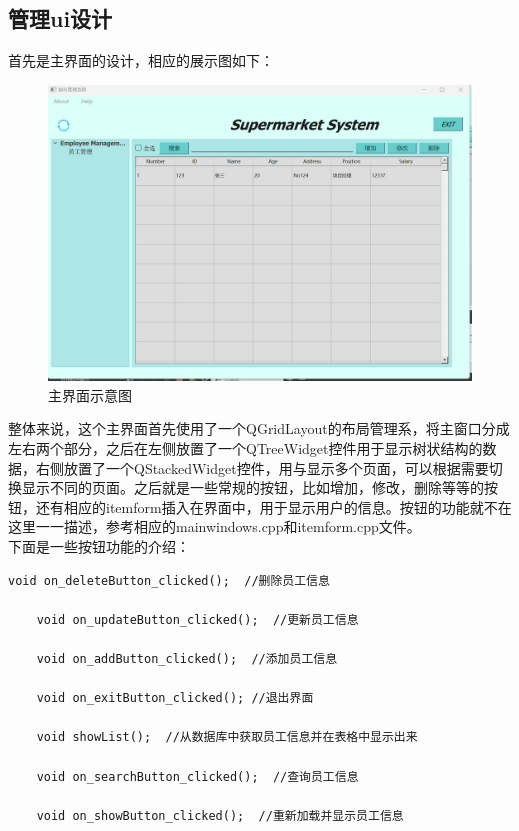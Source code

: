 \documentclass{article}
\begin{document}
\subsection{管理ui设计}
首先是主界面的设计，相应的展示图如下：
\begin{figure}[H]
        \centering
        \includegraphics[scale=0.6]{主界面.png}
        \caption{主界面示意图}
        \label{fig:enter-label}
\end{figure}
整体来说，这个主界面首先使用了一个QGridLayout的布局管理系，将主窗口分成左右两个部分，之后在左侧放置了一个QTreeWidget控件用于显示树状结构的数据，右侧放置了一个QStackedWidget控件，用与显示多个页面，可以根据需要切换显示不同的页面。之后就是一些常规的按钮，比如增加，修改，删除等等的按钮，还有相应的itemform插入在界面中，用于显示用户的信息。按钮的功能就不在这里一一描述，参考相应的mainwindows.cpp和itemform.cpp文件。
\\
下面是一些按钮功能的介绍：
\begin{lstlisting}[style=qtstyle, caption={Qt代码示例}, label=qt_example]
    void on_deleteButton_clicked();  //删除员工信息

    void on_updateButton_clicked();  //更新员工信息

    void on_addButton_clicked();  //添加员工信息

    void on_exitButton_clicked(); //退出界面
    
    void showList();  //从数据库中获取员工信息并在表格中显示出来

    void on_searchButton_clicked();  //查询员工信息

    void on_showButton_clicked();  //重新加载并显示员工信息

\end{lstlisting}
\end{document}
